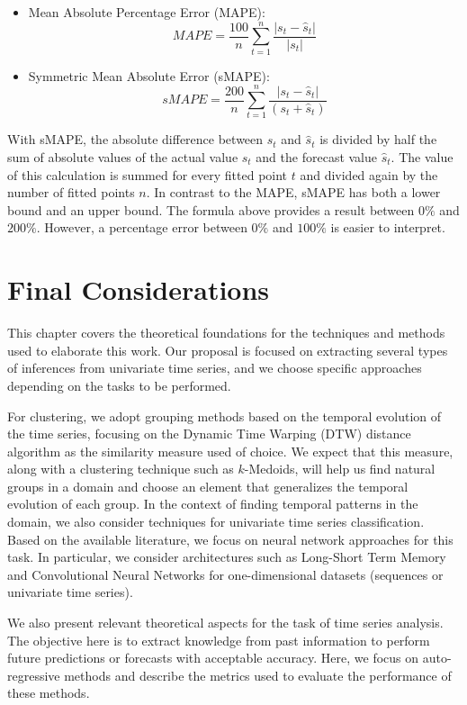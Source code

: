 \begin{itemize}	
	\item Mean Absolute Percentage Error (MAPE):
	\begin{equation}
	MAPE = \frac{100}{n}\sum_{t=1}^{n} \frac{\left|s_t-\hat{s}_t\right|}{|s_t|}
	\end{equation}	
	\item Symmetric Mean Absolute Error (sMAPE):	
	\begin{equation}
	sMAPE = \frac{200}{n}\sum_{t=1}^{n} \frac{\left|s_t-\hat{s}_t\right|}{\left(s_{t}+\hat{s}_{t}\right)}
	\end{equation}	
\end{itemize}

With sMAPE, the absolute difference between $s_{t}$ and $\hat{s}_{t}$ is divided by half the sum of absolute values of the actual value $s_{t}$ and the forecast value $\hat{s}_{t}$. The value of this calculation is summed for every fitted point $t$ and divided again by the number of fitted points $n$. In contrast to the MAPE, sMAPE has both a lower bound and an upper bound. The formula above provides a result between $0\%$ and $200\%$. However, a percentage error between $0\%$ and $100\%$ is easier to interpret.  

\section{Final Considerations}
\label{Sec:TheoFinalConsiderations}

This chapter covers the theoretical foundations for the techniques and methods used to elaborate this work. Our proposal is focused on extracting several types of inferences from univariate time series, and we choose specific approaches depending on the tasks to be performed.

For clustering, we adopt grouping methods based on the temporal evolution of the time series, focusing on the Dynamic Time Warping (DTW) distance algorithm as the similarity measure used of choice. We expect that this measure, along with a clustering technique such as $k$-Medoids, will help us find natural groups in a domain and choose an element that generalizes the temporal evolution of each group. In the context of finding temporal patterns in the domain, we also consider techniques for univariate time series classification. Based on the available literature, we focus on neural network approaches for this task. In particular, we consider architectures such as Long-Short Term Memory and Convolutional Neural Networks for one-dimensional datasets (sequences or univariate time series).

We also present relevant theoretical aspects for the task of time series analysis. The objective here is to extract knowledge from past information to perform future predictions or forecasts with acceptable accuracy. Here, we focus on auto-regressive methods and describe the metrics used to evaluate the performance of these methods.